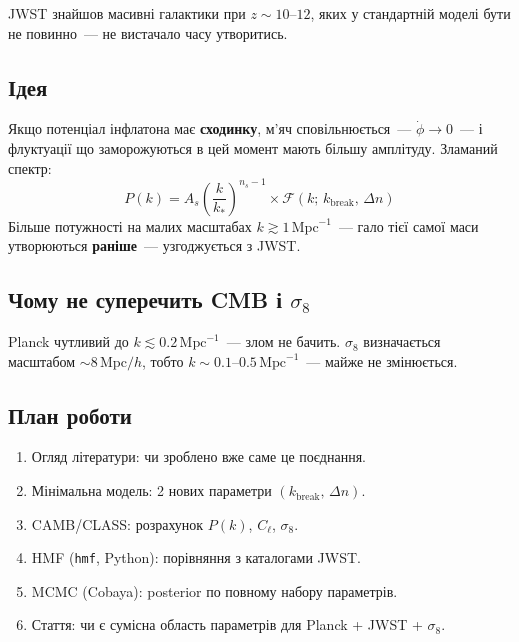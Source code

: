 \documentclass[12pt, a4paper]{article}
\begin{document}
JWST знайшов масивні галактики при $z \sim 10$--$12$, яких у стандартній
моделі бути не повинно~--- не вистачало часу утворитись.

\subsection{Ідея}

Якщо потенціал інфлатона має \textbf{сходинку}, м'яч сповільнюється~---
$\dot{\phi} \to 0$~--- і флуктуації що заморожуються в цей момент мають
більшу амплітуду. Зламаний спектр:
\[
  P(k) = A_s \left(\frac{k}{k_*}\right)^{n_s-1}
  \times \mathcal{F}(k;\, k_\mathrm{break},\, \Delta n)
\]
Більше потужності на малих масштабах $k \gtrsim 1\,\mathrm{Mpc}^{-1}$~---
гало тієї самої маси утворюються \textbf{раніше}~--- узгоджується з JWST.

\subsection{Чому не суперечить CMB і $\sigma_8$}

Planck чутливий до $k \lesssim 0.2\,\mathrm{Mpc}^{-1}$~--- злом не бачить.
$\sigma_8$ визначається масштабом $\sim 8\,\mathrm{Mpc}/h$, тобто
$k \sim 0.1$--$0.5\,\mathrm{Mpc}^{-1}$~--- майже не змінюється.

\subsection{План роботи}

\begin{enumerate}
  \item Огляд літератури: чи зроблено вже саме це поєднання.
  \item Мінімальна модель: 2 нових параметри $(k_\mathrm{break},\, \Delta n)$.
  \item CAMB/CLASS: розрахунок $P(k)$, $C_\ell$, $\sigma_8$.
  \item HMF (\texttt{hmf}, Python): порівняння з каталогами JWST.
  \item MCMC (Cobaya): posterior по повному набору параметрів.
  \item Стаття: чи є сумісна область параметрів для Planck + JWST + $\sigma_8$.
\end{enumerate}
\end{document}
